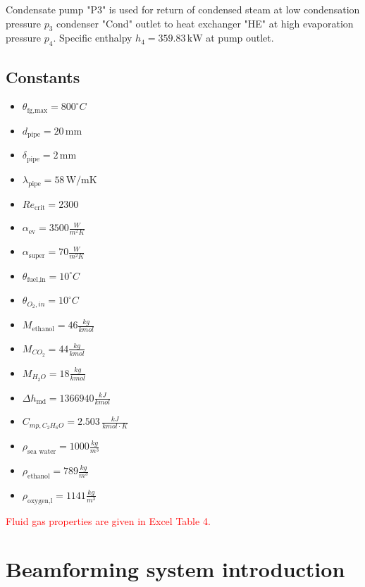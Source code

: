 \documentclass{article}
\begin{document}
	Condensate pump "P3" is used for return of condensed steam at low 
	condensation pressure $p_3$ condenser "Cond" outlet to heat exchanger "HE" 
	at high evaporation pressure $p_4$.
	Specific enthalpy $h_4 = 359.83 \,\textrm{kW}$ at pump outlet.

	\subsection{Constants}
	
	\begin{itemize}
		\item $\theta_\textrm{fg,max} = 800 ^\circ C$
		\item $d_\textrm{pipe} = 20 \,\textrm{mm}$
		\item $\delta_\textrm{pipe} = 2 \,\textrm{mm}$
		\item $\lambda_\textrm{pipe}  = 58 \,\textrm{W/mK}$
		\item $Re_\textrm{crit} = 2300$
		\item $\alpha_\textrm{ev} = 3500 \frac{W}{m^2K}$
		\item $\alpha_\textrm{super} = 70 \frac{W}{m^2K}$
		\item $\theta_\textrm{fuel,in} = 10 ^\circ C$
		\item $\theta_{O_2,in} = 10 ^\circ C$
		\item $M_\textrm{ethanol} = 46 \frac{kg}{kmol}$
		\item $M_{CO_2} = 44 \frac{kg}{kmol}$
		\item $M_{H_2O} = 18 \frac{kg}{kmol}$
		\item $\Delta h_\textrm{md} = 1366940 \frac{kJ}{kmol}$
		\item $C_{mp,C_2H_6O} = 2.503 \,\frac{kJ}{kmol \cdot K}$
		\item $\rho_\textrm{sea\ water} = 1000 \frac{kg}{m^3}$
		\item $\rho_\textrm{ethanol} = 789 \frac{kg}{m^3}$
		\item $\rho_\textrm{oxygen,l} = 1141 \frac{kg}{m^3}$
	\end{itemize}

	\noindent
	\textcolor{red}{Fluid gas properties are given in Excel Table 4.}

\clearpage

\section{Beamforming system introduction}
\end{document}

